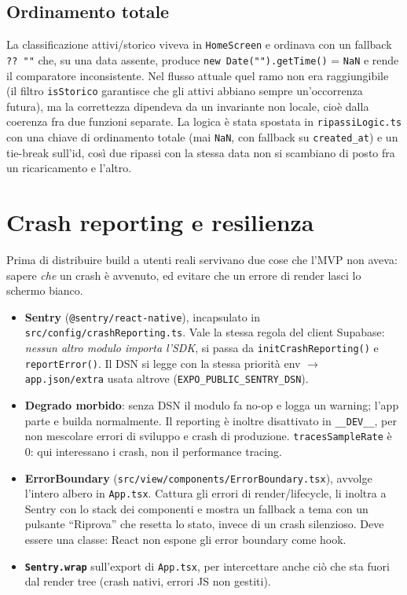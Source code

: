 \documentclass[11pt,a4paper]{report}
\begin{document}
\section{Ordinamento totale}

La classificazione attivi/storico viveva in \texttt{HomeScreen} e ordinava con
un fallback \texttt{?? ""} che, su una data assente, produce
\texttt{new Date("").getTime()} = \texttt{NaN} e rende il comparatore
inconsistente. Nel flusso attuale quel ramo non era raggiungibile (il filtro
\texttt{isStorico} garantisce che gli attivi abbiano sempre un'occorrenza
futura), ma la correttezza dipendeva da un invariante non locale, cio\`e dalla
coerenza fra due funzioni separate. La logica \`e stata spostata in
\texttt{ripassiLogic.ts} con una chiave di ordinamento totale (mai
\texttt{NaN}, con fallback su \texttt{created\_at}) e un tie-break sull'id,
cos\`i due ripassi con la stessa data non si scambiano di posto fra un
ricaricamento e l'altro.

\chapter{Crash reporting e resilienza}

Prima di distribuire build a utenti reali servivano due cose che l'MVP non
aveva: sapere \emph{che} un crash \`e avvenuto, ed evitare che un errore di
render lasci lo schermo bianco.

\begin{itemize}[nosep]
  \item \textbf{Sentry} (\texttt{@sentry/react-native}), incapsulato in
        \texttt{src/config/crashReporting.ts}. Vale la stessa regola del
        client Supabase: \emph{nessun altro modulo importa l'SDK}, si passa
        da \texttt{initCrashReporting()} e \texttt{reportError()}. Il DSN si
        legge con la stessa priorit\`a env $\rightarrow$
        \texttt{app.json/extra} usata altrove
        (\texttt{EXPO\_PUBLIC\_SENTRY\_DSN}).
  \item \textbf{Degrado morbido}: senza DSN il modulo fa no-op e logga un
        warning; l'app parte e builda normalmente. Il reporting \`e inoltre
        disattivato in \texttt{\_\_DEV\_\_}, per non mescolare errori di
        sviluppo e crash di produzione. \texttt{tracesSampleRate} \`e 0: qui
        interessano i crash, non il performance tracing.
  \item \textbf{ErrorBoundary} (\texttt{src/view/components/ErrorBoundary.tsx}),
        avvolge l'intero albero in \texttt{App.tsx}. Cattura gli errori di
        render/lifecycle, li inoltra a Sentry con lo stack dei componenti e
        mostra un fallback a tema con un pulsante ``Riprova'' che resetta lo
        stato, invece di un crash silenzioso. Deve essere una classe: React
        non espone gli error boundary come hook.
  \item \textbf{\texttt{Sentry.wrap}} sull'export di \texttt{App.tsx}, per
        intercettare anche ci\`o che sta fuori dal render tree (crash nativi,
        errori JS non gestiti).
\end{itemize}
\end{document}
